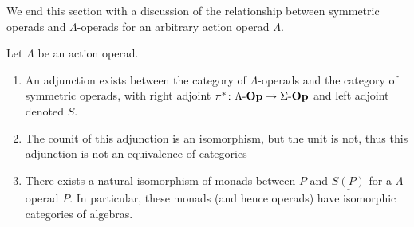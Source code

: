 We end this section with a discussion of the relationship between symmetric operads and $\Lambda$-operads for an arbitrary action operad $\Lambda$.

\begin{thm}\label{thm_sym}
Let $\Lambda$ be an action operad.
\begin{enumerate}
\item An adjunction exists between the category of $\Lambda$-operads and the category of symmetric operads, with right adjoint $\pi^{*} \colon \Lambda\mbox{-}\mathbf{Op} \rightarrow \Sigma\mbox{-}\mathbf{Op}$ and left adjoint denoted $S$.
\item The counit of this adjunction is an isomorphism, but the unit is not, thus this adjunction is not an equivalence of categories
\item There exists a natural isomorphism of monads between $\underline{P}$ and $\underline{S(P)}$ for a $\Lambda$-operad $P$. In particular, these monads (and hence operads) have isomorphic categories of algebras.
\end{enumerate}
\end{thm}
